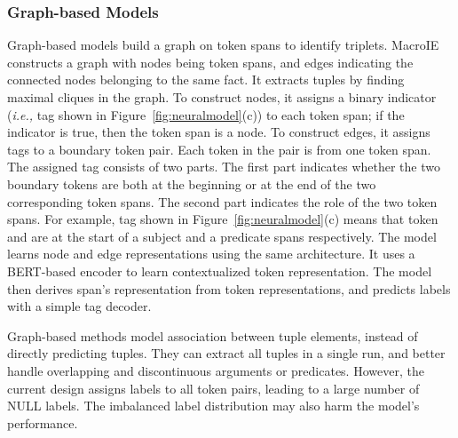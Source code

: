 \documentclass{article}
\newcommand{\ie}{\emph{i.e.,}\xspace}
\begin{document}
\subsubsection{Graph-based Models}
Graph-based models build a graph on token spans to identify triplets. MacroIE \cite{yu2021maximal} constructs a graph with nodes being token spans, and edges indicating the connected nodes belonging to the same fact. It extracts tuples by finding maximal cliques in the graph. To construct nodes, it assigns a binary indicator (\ie  tag shown in Figure~\ref{fig:neuralmodel}(c)) to each token span; if the indicator is true, then the token span is a node. To construct edges, it assigns tags to a boundary token pair. Each token in the pair is from one token span. The assigned tag consists of two parts. The first part indicates whether the two boundary tokens are both at the beginning or at the end of the two corresponding token spans. The second part indicates the role of the two token spans. For example,  tag shown in Figure~\ref{fig:neuralmodel}(c) means that token  and  are at the start of a subject and a predicate spans respectively.  The model learns  node and edge representations using the same architecture. It uses a BERT-based encoder to learn contextualized token representation. The model then derives span's representation from token representations, and predicts labels with a simple tag decoder.

Graph-based methods model association between tuple elements, instead of directly predicting tuples. They can extract all tuples in a single run, and better handle overlapping and discontinuous arguments or predicates. However, the current design assigns labels to all token pairs, leading to a large number of NULL labels. The imbalanced label distribution may also harm the model's performance.
\end{document}
